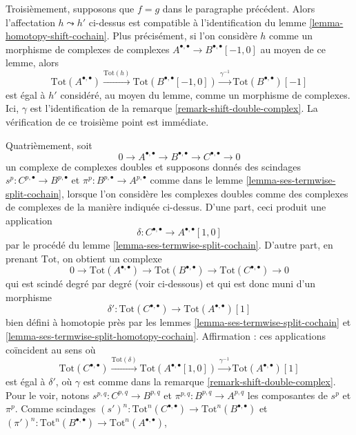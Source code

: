 \begin{remark}
\medskip\noindent
Troisièmement, supposons que $f = g$ dans le paragraphe précédent.
Alors l'affectation $h \leadsto h'$ ci-dessus est compatible à
l'identification du lemme \ref{lemma-homotopy-shift-cochain}.
Plus précisément, si l'on considère $h$ comme un morphisme de complexes
de complexes $A^{\bullet, \bullet} \to B^{\bullet, \bullet}[-1, 0]$
au moyen de ce lemme, alors
$$
\text{Tot}(A^{\bullet, \bullet})
\xrightarrow{\text{Tot}(h)}
\text{Tot}(B^{\bullet, \bullet}[-1, 0])
\xrightarrow{\gamma^{-1}}
\text{Tot}(B^{\bullet, \bullet})[-1]
$$
est égal à $h'$ considéré, au moyen du lemme, comme un morphisme de complexes.
Ici, $\gamma$ est l'identification de la
remarque \ref{remark-shift-double-complex}.
La vérification de ce troisième point est immédiate.

\medskip\noindent
Quatrièmement, soit
$$
0 \to A^{\bullet, \bullet} \to B^{\bullet, \bullet} \to
C^{\bullet, \bullet} \to 0
$$
un complexe de complexes doubles et supposons donnés des scindages
$s^p : C^{p, \bullet} \to B^{p, \bullet}$ et
$\pi^p : B^{p, \bullet} \to A^{p, \bullet}$
comme dans le lemme \ref{lemma-ses-termwise-split-cochain},
lorsque l'on considère les complexes doubles
comme des complexes de complexes de la manière indiquée ci-dessus.
D'une part, ceci produit une application
$$
\delta : C^{\bullet, \bullet} \longrightarrow A^{\bullet, \bullet}[1, 0]
$$
par le procédé du lemme \ref{lemma-ses-termwise-split-cochain}.
D'autre part, en prenant $\text{Tot}$, on obtient un complexe
$$
0 \to \text{Tot}(A^{\bullet, \bullet}) \to
\text{Tot}(B^{\bullet, \bullet}) \to
\text{Tot}(C^{\bullet, \bullet}) \to 0
$$
qui est scindé degré par degré (voir ci-dessous) et qui est donc muni d'un morphisme
$$
\delta' :
\text{Tot}(C^{\bullet, \bullet})
\longrightarrow
\text{Tot}(A^{\bullet, \bullet})[1]
$$
bien défini à homotopie près par les lemmes \ref{lemma-ses-termwise-split-cochain}
et \ref{lemma-ses-termwise-split-homotopy-cochain}. Affirmation :
ces applications coïncident au sens où
$$
\text{Tot}(C^{\bullet, \bullet})
\xrightarrow{\text{Tot}(\delta)}
\text{Tot}(A^{\bullet, \bullet}[1, 0]) \xrightarrow{\gamma^{-1}}
\text{Tot}(A^{\bullet, \bullet})[1]
$$
est égal à $\delta'$, où $\gamma$ est comme dans la
remarque \ref{remark-shift-double-complex}. Pour le voir, notons
$s^{p, q} : C^{p, q} \to B^{p, q}$ et
$\pi^{p, q} : B^{p, q} \to A^{p, q}$ les composantes de $s^p$ et $\pi^p$.
Comme scindages
$(s')^n : \text{Tot}^n(C^{\bullet, \bullet}) \to
\text{Tot}^n(B^{\bullet, \bullet})$
et
$(\pi')^n : \text{Tot}^n(B^{\bullet, \bullet}) \to
\text{Tot}^n(A^{\bullet, \bullet})$,

\end{remark}
